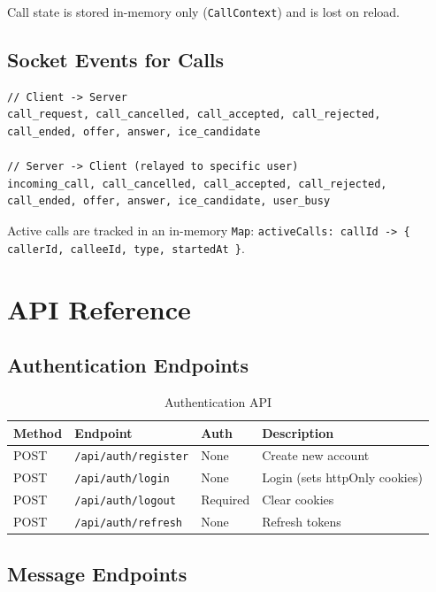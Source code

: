 \documentclass[12pt,a4paper]{article}
\newcommand{\code}[1]{\texttt{#1}}
\begin{document}
Call state is stored in-memory only (\code{CallContext}) and is lost on reload.

\subsection{Socket Events for Calls}
\label{sec:call-socket}

\begin{lstlisting}[style=js]
// Client -> Server
call_request, call_cancelled, call_accepted, call_rejected,
call_ended, offer, answer, ice_candidate

// Server -> Client (relayed to specific user)
incoming_call, call_cancelled, call_accepted, call_rejected,
call_ended, offer, answer, ice_candidate, user_busy
\end{lstlisting}

Active calls are tracked in an in-memory \code{Map}:
\code{activeCalls: callId -> \{ callerId, calleeId, type, startedAt \}}.

\section{API Reference}
\label{sec:api}

\subsection{Authentication Endpoints}
\label{sec:auth-endpoints}

\begin{table}[H]
    \centering
    \caption{Authentication API}
    \begin{tabular}{lllp{5.5cm}}
        \toprule
        \textbf{Method} & \textbf{Endpoint}         & \textbf{Auth} & \textbf{Description} \\
        \midrule
        POST & \code{/api/auth/register}   & None     & Create new account \\
        POST & \code{/api/auth/login}      & None     & Login (sets httpOnly cookies) \\
        POST & \code{/api/auth/logout}    & Required & Clear cookies \\
        POST & \code{/api/auth/refresh}   & None     & Refresh tokens \\
        \bottomrule
    \end{tabular}
\end{table}

\subsection{Message Endpoints}
\label{sec:message-endpoints}
\end{document}
